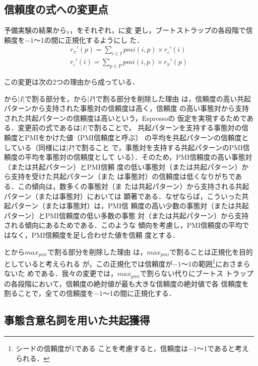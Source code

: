 \documentclass[japanese]{jnlp_1.4}
\begin{document}
\subsection{信頼度の式への変更点}
\label{ssec:eq_change}

予備実験の結果から，，をそれぞれ，に変
更し，ブートストラップの各段階で信頼度を$-1$〜1の間に正規化するようにし
た．
\begin{gather}
  \label{eq:rpi2}
  r_\pi'(p) =
  \sum_{i \in I}
  \mathit{pmi}(i,p)
  \times r_\iota'(i) \\
  \label{eq:rl2}
  r_\iota'(i) =
  \sum_{p \in P}
  \mathit{pmi}(i,p)
  \times r_\pi'(p)
\end{gather}

この変更は次の2つの理由から成っている．

から$|I|$で割る部分を，から$|P|$で割る部分を削除した理由
は，信頼度の高い共起パターンから支持された事態対の信頼度は高く，信頼度
の高い事態対から支持された共起パターンの信頼度は高いという，Espressoの
仮定を実現するためである．変更前の式であるは$|I|$で割ることで，
共起パターンを支持する事態対の信頼度とPMIをかけた値（PMI信頼度と呼ぶ）
の平均を共起パターンの信頼度としている（同様には$|P|$で割ること
で，事態対を支持する共起パターンのPMI信頼度の平均を事態対の信頼度として
いる）．そのため，PMI信頼度の高い事態対（または共起パターン）とPMI信頼
度の低い事態対（または共起パターン）から支持を受けた共起パターン（また
は事態対）の信頼度は低くなりがちである．この傾向は，数多くの事態対（ま
たは共起パターン）から支持される共起パターン（または事態対）においては
顕著である．なぜならば，こういった共起パターン（または事態対）は，PMI信
頼度の高い少数の事態対（または共起パターン）とPMI信頼度の低い多数の事態
対（または共起パターン）から支持される傾向にあるためである．このような
傾向を考慮し，PMI信頼度の平均ではなく，PMI信頼度を足し合わせた値を信頼
度とする．

とから$\mathit{max}_{pmi}$で割る部分を削除した理由
は，$\mathit{max}_{pmi}$で割ることは正規化を目的としていると考えられる
が，この正規化では信頼度が$-1$〜1の範囲\footnote{シードの信頼度が1である
  ことを考慮すると，信頼度は$-1$〜1であると考えられる．}におさまらないた
めである．我々の変更では，$\mathit{max}_{pmi}$で割らない代りにブートス
トラップの各段階において，信頼度の絶対値が最も大きな信頼度の絶対値で各
信頼度を割ることで，全ての信頼度を$-1$〜1の間に正規化する．


\subsection{事態含意名詞を用いた共起獲得}
\label{ssec:verbal_nouns}
\end{document}
